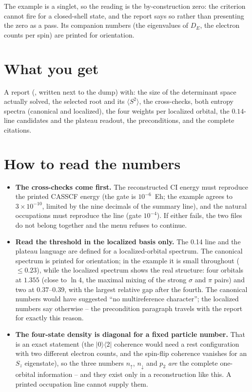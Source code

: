 The example is a singlet, so the reading is the by-construction zero: the
criterion cannot fire for a closed-shell state, and the report says so rather
than presenting the zero as a pass. Its companion numbers (the eigenvalues of
$D_E$, the electron counts per spin) are printed for orientation.


\section{What you get}

A report (, written next to the dump) with: the size of
the determinant space actually solved, the selected root and its $\langle
S^2\rangle$, the cross-checks, both entropy spectra (canonical and localized),
the four weights per localized orbital, the $0.14$-line candidates and the
plateau readout, the preconditions, and the complete citations.

\section{How to read the numbers}

\begin{readbox}
\begin{itemize}
  \item \textbf{The cross-checks come first.} The reconstructed CI energy must
    reproduce the printed CASSCF energy (the gate is $10^{-6}$~Eh; the example
    agrees to $3\times10^{-10}$, limited by the nine decimals of the summary
    line), and the natural occupations must reproduce the  line
    (gate $10^{-4}$). If either fails, the two files do not belong together and
    the menu refuses to continue.
  \item \textbf{Read the threshold in the localized basis only.} The 0.14 line
    and the plateau language are defined for a localized-orbital spectrum. The
    canonical spectrum is printed for orientation; in the example it is small
    throughout ($\le 0.23$), while the localized spectrum shows the real
    structure: four orbitals at $1.355$ (close to $\ln 4$, the maximal mixing
    of the strong $\sigma$ and $\pi$ pairs) and two at $0.37$--$0.39$, with the
    largest relative gap after the fourth. The canonical numbers would have
    suggested ``no multireference character''; the localized numbers say
    otherwise -- the precondition paragraph travels with the report for
    exactly this reason.
  \item \textbf{The four-state density is diagonal for a fixed particle
    number.} That is an exact statement (the $|0\rangle\!\langle 2|$ coherence
    would need a rest configuration with two different electron counts, and
    the spin-flip coherence vanishes for an $S_z$ eigenstate), so the three
    numbers $n_\uparrow$, $n_\downarrow$ and $p_2$ \emph{are} the complete
    one-orbital information -- and they exist only in a reconstruction like
    this. A printed occupation line cannot supply them.
\end{itemize}
\end{readbox}

